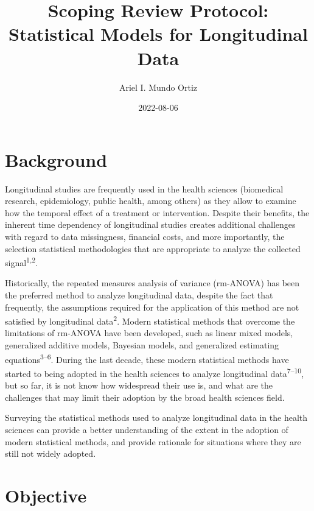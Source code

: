 \documentclass[
]{article}
\title{Scoping Review Protocol: Statistical Models for Longitudinal
Data}
\author{Ariel I. Mundo Ortiz}
\date{2022-08-06}
\renewcommand*\contentsname{Table of contents}
\newcommand\contentsname{Table of contents}
\begin{document}
\maketitle
\ifdefined\Shaded\renewenvironment{Shaded}{\begin{tcolorbox}[frame hidden, borderline west={3pt}{0pt}{shadecolor}, breakable, interior hidden, boxrule=0pt, enhanced, sharp corners]}{\end{tcolorbox}}\fi

\renewcommand*\contentsname{Table of contents}
{
\hypersetup{linkcolor=}
\setcounter{tocdepth}{3}
\tableofcontents
}
\hypertarget{background}{%
\section{Background}\label{background}}

Longitudinal studies are frequently used in the health sciences
(biomedical research, epidemiology, public health, among others) as they
allow to examine how the temporal effect of a treatment or intervention.
Despite their benefits, the inherent time dependency of longitudinal
studies creates additional challenges with regard to data missingness,
financial costs, and more importantly, the selection statistical
methodologies that are appropriate to analyze the collected
signal\textsuperscript{1,2}.

Historically, the repeated measures analysis of variance (rm-ANOVA) has
been the preferred method to analyze longitudinal data, despite the fact
that frequently, the assumptions required for the application of this
method are not satisfied by longitudinal data\textsuperscript{2}. Modern
statistical methods that overcome the limitations of rm-ANOVA have been
developed, such as linear mixed models, generalized additive models,
Bayesian models, and generalized estimating
equations\textsuperscript{3--6}. During the last decade, these modern
statistical methods have started to being adopted in the health sciences
to analyze longitudinal data\textsuperscript{7--10}, but so far, it is
not know how widespread their use is, and what are the challenges that
may limit their adoption by the broad health sciences field.

Surveying the statistical methods used to analyze longitudinal data in
the health sciences can provide a better understanding of the extent in
the adoption of modern statistical methods, and provide rationale for
situations where they are still not widely adopted.

\hypertarget{objective}{%
\section{Objective}\label{objective}}
\end{document}
